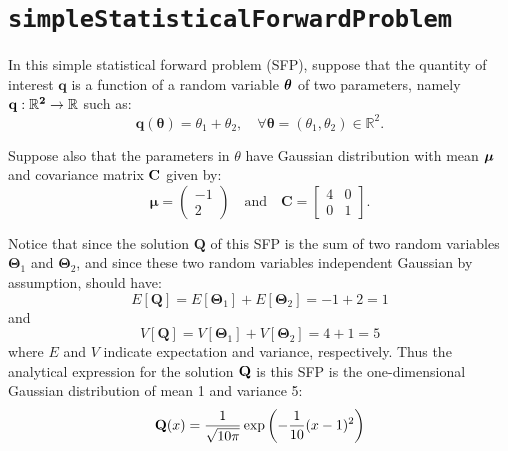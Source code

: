 
\section{\texttt{simpleStatisticalForwardProblem}}\label{sec:example_sfp}

In this simple statistical forward problem (SFP), suppose that the quantity of interest $\mathbf{q}$ is a function of a random variable $\mbox{\boldmath$ \theta $}$ of two parameters, namely $\bf{q}:\mathbb{R}^2\rightarrow\mathbb{R}$ such as:
\begin{equation}\label{eq-example-q}
\mathbf{q}(\boldsymbol{\theta}) = \theta_1+\theta_2,\quad\forall\boldsymbol{\theta}=(\theta_1,\theta_2)\in\mathbb{R}^2.
\end{equation}

Suppose also that the parameters in $\theta$ have Gaussian distribution with mean $\mbox{\boldmath$ \mu $}$ and covariance matrix $\bf{C}$ given by:
\begin{equation}\label{eq-example-mu-sfp}
\boldsymbol{\mu} = 
\left(\begin{array}{c}
-1 \\
2
\end{array}\right)
\quad
\text{and}
\quad
\mathbf{C} = 
\left[\begin{array}{cc}
4 & 0 \\
0 & 1
\end{array}\right].
\end{equation}


Notice that since the solution $\mathbf{Q}$ of this SFP is the sum of two random variables $\boldsymbol{\Theta}_1$ and $\boldsymbol{\Theta}_2$, and since these two random variables independent Gaussian by assumption, should have:
\begin{equation}\label{eq-example-E}
E[\mathbf{Q}] = E[\boldsymbol{\Theta}_1] + E[\boldsymbol{\Theta}_2] = -1 + 2 = 1
\end{equation}
and
\begin{equation}\label{eq-example-V}
V[\mathbf{Q}] = V[\boldsymbol{\Theta}_1] + V[\boldsymbol{\Theta}_2] = 4 + 1 = 5
\end{equation}
where $E$ and $V$ indicate expectation and variance, respectively. Thus the analytical expression for the solution $\bf{Q}$ is this SFP is the one-dimensional Gaussian distribution of mean 1 and variance 5:
\begin{equation}\label{eq-example-sfp-analytical}
{\bf Q}(x)=   \frac{1}{ \sqrt{10\pi}} \exp\left(-\frac{1}{10}(x-1)^2 \right)
\end{equation}


